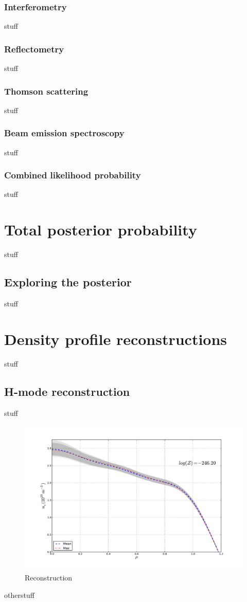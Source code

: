 \documentclass[12pt]{article}
\numberwithin{equation}{section}
\begin{document}
\subsubsection{Interferometry}
stuff
\subsubsection{Reflectometry}
stuff
\subsubsection{Thomson scattering}
stuff
\subsubsection{Beam emission spectroscopy}
stuff
\subsubsection{Combined likelihood probability}
stuff
\section{Total posterior probability}
stuff
\subsection{Exploring the posterior}
stuff
\section{Density profile reconstructions}
stuff
\subsection{H-mode reconstruction}
stuff
\begin{figure}[ht]
	\centering
	\includegraphics[width=12cm,keepaspectratio=true]{figures/bfit146102_00505_all5}
	\vspace{-30pt}
	\caption{Reconstruction}
\end{figure}
otherstuff
\end{document}
